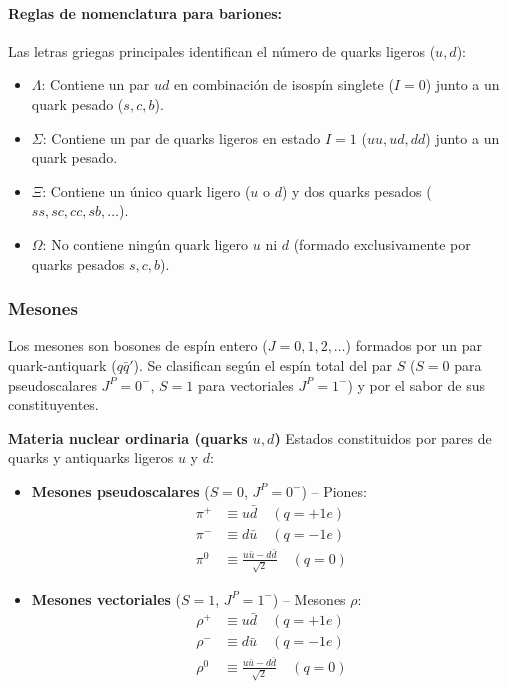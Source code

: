 \paragraph{Reglas de nomenclatura para bariones:}
Las letras griegas principales identifican el número de quarks ligeros ($u, d$):
\begin{itemize}
    \item $\Lambda$: Contiene un par $ud$ en combinación de isospín singlete ($I=0$) junto a un quark pesado ($s, c, b$).
    \item $\Sigma$: Contiene un par de quarks ligeros en estado $I=1$ ($uu, ud, dd$) junto a un quark pesado.
    \item $\Xi$: Contiene un único quark ligero ($u$ o $d$) y dos quarks pesados ($ss, sc, cc, sb, \dots$).
    \item $\Omega$: No contiene ningún quark ligero $u$ ni $d$ (formado exclusivamente por quarks pesados $s, c, b$).
\end{itemize}

\subsubsection{Mesones}

Los mesones son bosones de espín entero ($J = 0, 1, 2, \dots$) formados por un par quark-antiquark ($q\bar{q}'$). Se clasifican según el espín total del par $S$ ($S = 0$ para pseudoscalares $J^P = 0^-$, $S = 1$ para vectoriales $J^P = 1^-$) y por el sabor de sus constituyentes.

\textbf{Materia nuclear ordinaria (quarks $u, d$)}
Estados constituidos por pares de quarks y antiquarks ligeros $u$ y $d$:
\begin{itemize}
    \item \textbf{Mesones pseudoscalares} ($S = 0$, $J^P = 0^-$) -- Piones:
    \begin{align}
        \pi^+ &\equiv u\bar{d} \quad (q = +1e) \\
        \pi^- &\equiv d\bar{u} \quad (q = -1e) \\
        \pi^0 &\equiv \frac{u\bar{u} - d\bar{d}}{\sqrt{2}} \quad (q = 0)
    \end{align}
    \item \textbf{Mesones vectoriales} ($S = 1$, $J^P = 1^-$) -- Mesones $\rho$:
    \begin{align}
        \rho^+ &\equiv u\bar{d} \quad (q = +1e) \\
        \rho^- &\equiv d\bar{u} \quad (q = -1e) \\
        \rho^0 &\equiv \frac{u\bar{u} - d\bar{d}}{\sqrt{2}} \quad (q = 0)
    \end{align}
\end{itemize}


